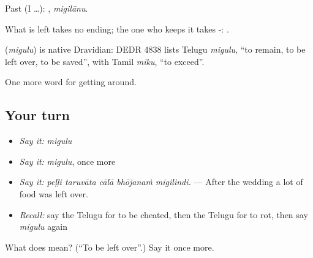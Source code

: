 Past (I …): , \emph{migilānu}.

What is left takes no ending; the one who keeps it takes -:    .

\begin{cousinweb}
\textbf{} (\emph{migulu}) is native Dravidian: DEDR 4838 lists Telugu \emph{migulu}, \textquotedblleft{}to remain, to be left over, to be saved\textquotedblright{}, with Tamil \emph{miku}, \textquotedblleft{}to exceed\textquotedblright{}.
\end{cousinweb}

\begin{grammarlens}[title={What you've built}]
One more word for getting around.
\end{grammarlens}

\subsection*{Your turn}
\begin{itemize}
\raggedright
  \item \emph{Say it:} \emph{migulu}
  \item \emph{Say it:} \emph{migulu}, once more
  \item \emph{Say it:} \emph{peḷḷi taruvāta cālā bhōjanaṁ migilindi.} — After the wedding a lot of food was left over.
  \item \emph{Recall:} say the Telugu for to be cheated, then the Telugu for to rot, then say \emph{migulu} again
\end{itemize}

\begin{tcolorbox}[breakable,colback=teal!4,colframe=teal!35!black,title={Before you move on}]
What does  mean? (\textquotedblleft{}To be left over\textquotedblright{}.) Say it once more.
\end{tcolorbox}

